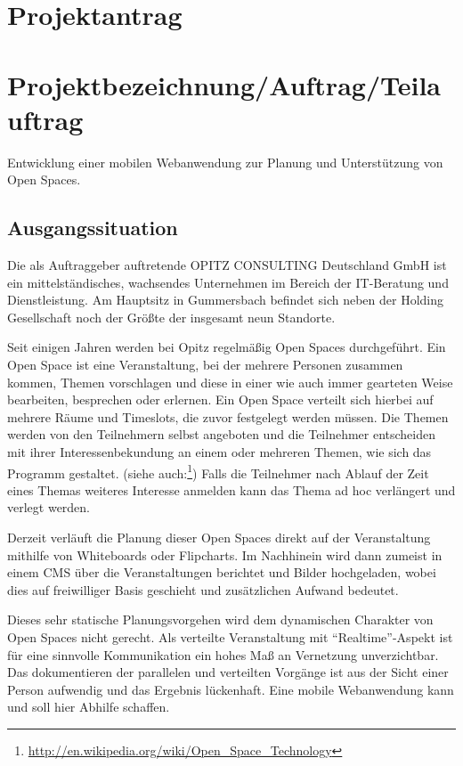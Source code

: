 \section{Projektantrag}
\section*{Projektbezeichnung/Auftrag/Teilauftrag}
Entwicklung einer mobilen Webanwendung zur Planung und Unterstützung von Open Spaces.
\subsection*{Ausgangssituation}
Die als Auftraggeber auftretende OPITZ CONSULTING Deutschland GmbH ist ein mittelständisches, wachsendes Unternehmen im Bereich der IT-Beratung und Dienstleistung. Am Hauptsitz in Gummersbach befindet sich neben der Holding Gesellschaft noch der Größte der insgesamt neun Standorte.

\noindent Seit einigen Jahren werden bei Opitz regelmäßig Open Spaces durchgeführt.
Ein Open Space ist eine Veranstaltung, bei der mehrere Personen zusammen kommen, Themen vorschlagen und diese in einer wie auch immer gearteten Weise bearbeiten, besprechen oder erlernen. Ein Open Space verteilt sich hierbei auf mehrere Räume und Timeslots, die zuvor festgelegt werden müssen. Die Themen werden von den Teilnehmern selbst angeboten und die Teilnehmer entscheiden mit ihrer Interessenbekundung an einem oder mehreren Themen, wie sich das Programm gestaltet.
(siehe auch:\footnote{\url{http://en.wikipedia.org/wiki/Open_Space_Technology}})
Falls die Teilnehmer nach Ablauf der Zeit eines Themas weiteres Interesse anmelden kann das Thema ad hoc verlängert und verlegt werden.

\noindent Derzeit verläuft die Planung dieser Open Spaces direkt auf der Veranstaltung mithilfe von Whiteboards oder Flipcharts. Im Nachhinein wird dann zumeist in einem CMS über die Veranstaltungen berichtet und Bilder hochgeladen, wobei dies auf freiwilliger Basis geschieht und zusätzlichen Aufwand bedeutet.

\noindent Dieses sehr statische Planungsvorgehen wird dem dynamischen Charakter von Open Spaces nicht gerecht. Als verteilte Veranstaltung mit ``Realtime''-Aspekt ist für eine sinnvolle Kommunikation ein hohes Maß an Vernetzung unverzichtbar. Das dokumentieren der parallelen und verteilten Vorgänge ist aus der Sicht einer Person aufwendig und das Ergebnis lückenhaft. Eine mobile Webanwendung kann und soll hier Abhilfe schaffen.
